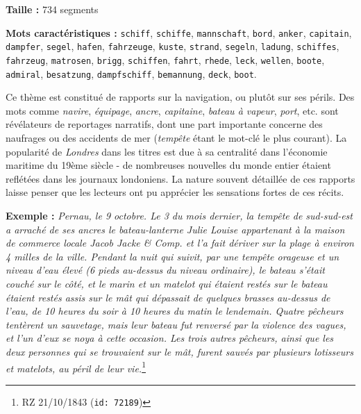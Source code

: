 \documentclass[a4paper,twoside,12pt]{article}
\begin{document}
\begin{flushleft}
\textbf{Taille :} 734 segments

\textbf{Mots caractéristiques :} \texttt{schiff}, \texttt{schiffe}, \texttt{mannschaft}, \texttt{bord}, \texttt{anker}, \texttt{capitain}, \texttt{dampfer}, \texttt{segel}, \texttt{hafen}, \texttt{fahrzeuge}, \texttt{kuste}, \texttt{strand}, \texttt{segeln}, \texttt{ladung}, \texttt{schiffes}, \texttt{fahrzeug}, \texttt{matrosen}, \texttt{brigg}, \texttt{schiffen}, \texttt{fahrt}, \texttt{rhede}, \texttt{leck}, \texttt{wellen}, \texttt{boote}, \texttt{admiral}, \texttt{besatzung}, \texttt{dampfschiff}, \texttt{bemannung}, \texttt{deck}, \texttt{boot}.
\end{flushleft}

\noindent Ce thème est constitué de rapports sur la navigation, ou plutôt sur ses périls. Des mots comme \textit{navire}, \textit{équipage}, \textit{ancre}, \textit{capitaine}, \textit{bateau à vapeur}, \textit{port}, etc. sont révélateurs de reportages narratifs, dont une part importante concerne des naufrages ou des accidents de mer (\textit{tempête} étant le mot-clé le plus courant). La popularité de \textit{Londres} dans les titres est due à sa centralité dans l'économie maritime du 19ème siècle - de nombreuses nouvelles du monde entier étaient reflétées dans les journaux londoniens. La nature souvent détaillée de ces rapports laisse penser que les lecteurs ont pu apprécier les sensations fortes de ces récits.

\medskip

\noindent \textbf{Exemple :} \textit{Pernau, le 9 octobre. Le 3 du mois dernier, la tempête de sud-sud-est a arraché de ses ancres le bateau-lanterne \og Julie Louise \fg{} appartenant à la maison de commerce locale Jacob Jacke \& Comp. et l'a fait dériver sur la plage à environ 4 milles de la ville. Pendant la nuit qui suivit, par une tempête orageuse et un niveau d'eau élevé (6 pieds au-dessus du niveau ordinaire), le bateau s'était couché sur le côté, et le marin et un matelot qui étaient restés sur le bateau étaient restés assis sur le mât qui dépassait de quelques brasses au-dessus de l'eau, de 10 heures du soir à 10 heures du matin le lendemain. Quatre pêcheurs tentèrent un sauvetage, mais leur bateau fut renversé par la violence des vagues, et l'un d'eux se noya à cette occasion. Les trois autres pêcheurs, ainsi que les deux personnes qui se trouvaient sur le mât, furent sauvés par plusieurs lotisseurs et matelots, au péril de leur vie.}\footnote{RZ 21/10/1843 (\texttt{id: 72189})}
\end{document}
